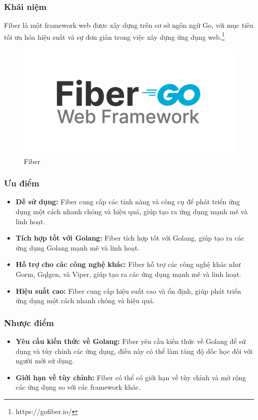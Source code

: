 \subsubsection{Khái niệm}
\noindent Fiber là một framework web được xây dựng trên cơ sở ngôn ngữ Go, với mục tiêu tối ưu hóa hiệu suất và sự đơn giản trong việc xây dựng ứng dụng web.\footnote{https://gofiber.io/}
\begin{figure}[H]
  \begin{center}
    \includegraphics[scale=0.25]{images/hieu/phuluc/fiber.png}
    \caption{Fiber}
  \end{center}
\end{figure}
\subsubsection{Ưu điểm}
\begin{itemize}
  \item \textbf{Dễ sử dụng:} Fiber cung cấp các tính năng và công cụ để phát triển ứng dụng một cách nhanh chóng và hiệu quả, giúp tạo ra ứng dụng mạnh mẽ và linh hoạt.
  \item \textbf{Tích hợp tốt với Golang:} Fiber tích hợp tốt với Golang, giúp tạo ra các ứng dụng Golang mạnh mẽ và linh hoạt.
  \item \textbf{Hỗ trợ cho các công nghệ khác:} Fiber hỗ trợ các công nghệ khác như Gorm, Gqlgen, và Viper, giúp tạo ra các ứng dụng mạnh mẽ và linh hoạt.
  \item \textbf{Hiệu suất cao:} Fiber cung cấp hiệu suất cao và ổn định, giúp phát triển ứng dụng một cách nhanh chóng và hiệu quả.
\end{itemize}
\subsubsection{Nhược điểm}
\begin{itemize}
  \item \textbf{Yêu cầu kiến thức về Golang:} Fiber yêu cầu kiến thức về Golang để sử dụng và tùy chỉnh các ứng dụng, điều này có thể làm tăng độ dốc học đối với người mới sử dụng.
  \item \textbf{Giới hạn về tùy chỉnh:} Fiber có thể có giới hạn về tùy chỉnh và mở rộng các ứng dụng so với các framework khác.
\end{itemize}

